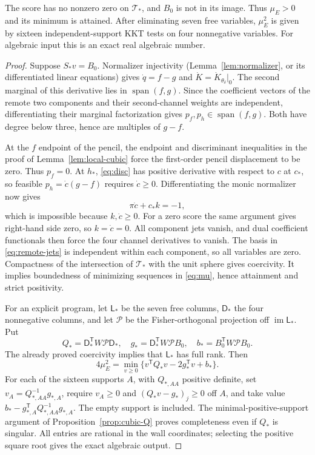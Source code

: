 \begin{lemma}\label{lem:mu-positive}
The score has no nonzero zero on $\mathcal T_*$, and $B_0$ is not in
its image. Thus $\mu_E>0$ and its minimum is attained. After eliminating
seven free variables, $\mu_E^2$ is given by sixteen independent-support
KKT tests on four nonnegative variables. For algebraic input this is
an exact real algebraic number.
\end{lemma}
\begin{proof}
Suppose $S_*v=B_0$. Normalizer injectivity
(Lemma~\ref{lem:normalizer}, or its differentiated linear equations)
gives $\dot q=f-g$ and $\dot K=\dot K_{\theta_\delta}|_0$.
The second marginal of this derivative lies in $\operatorname{span}(f,g)$.
Since the coefficient vectors of the remote two components and their
second-channel weights are independent, differentiating their marginal
factorization gives $p_f,p_h\in\operatorname{span}(f,g)$. Both have
degree below three, hence are multiples of $g-f$.

At the $f$ endpoint of the pencil, the endpoint and discriminant
inequalities in the proof of Lemma~\ref{lem:local-cubic} force the
first-order pencil displacement to be zero. Thus $p_f=0$. At $h_*$,
\eqref{eq:disc} has positive derivative with respect to $c$ at $c_*$,
so feasible $p_h=\dot c(g-f)$ requires $\dot c\ge0$. Differentiating
the monic normalizer now gives
\begin{equation}\label{eq:wall-obstruction}
 \pi\dot c+c_*k=-1,
\end{equation}
which is impossible because $k,\dot c\ge0$.
For a zero score the same argument gives right-hand side zero, so
$k=\dot c=0$. All component jets vanish, and dual coefficient
functionals then force the four channel derivatives to vanish.
The basis in \eqref{eq:remote-jets} is independent within each component,
so all variables are zero. Compactness of the intersection of
$\mathcal T_*$ with the unit sphere gives coercivity. It implies
boundedness of minimizing sequences in \eqref{eq:mu}, hence attainment
and strict positivity.

For an explicit program, let $\mathsf L_*$ be the seven free columns,
$\mathsf D_*$ the four nonnegative columns, and let $\mathcal P$ be the
Fisher-orthogonal projection off $\operatorname{im}\mathsf L_*$. Put
\[
 Q_*=\mathsf D_*^{\mathsf T}W\mathcal P\mathsf D_*,\quad
 g_*=\mathsf D_*^{\mathsf T}W\mathcal P B_0,\quad
 b_*=B_0^{\mathsf T}W\mathcal P B_0.
\]
The already proved coercivity implies that $\mathsf L_*$ has full rank. Then
\begin{equation}\label{eq:entrance-QP}
 4\mu_E^2=\min_{v\ge0}\{v^{\mathsf T}Q_*v-2g_*^{\mathsf T}v+b_*\}.
\end{equation}
For each of the sixteen supports $A$, with $Q_{*,AA}$ positive definite,
set $v_A=Q_{*,AA}^{-1}g_{*,A}$, require $v_A\ge0$ and
$(Q_*v-g_*)_j\ge0$ off $A$, and take value
$b_*-g_{*,A}^{\mathsf T}Q_{*,AA}^{-1}g_{*,A}$. The empty support is
included. The minimal-positive-support argument of
Proposition~\ref{prop:cubic-Q} proves completeness even if $Q_*$ is
singular. All entries are rational in the wall coordinates; selecting
the positive square root gives the exact algebraic output.
\end{proof}

